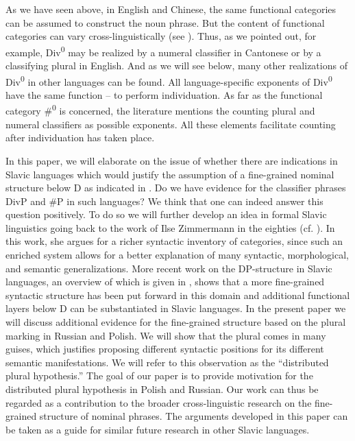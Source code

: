 \documentclass[output=paper,colorlinks,citecolor=brown,
]{langscibook}
\begin{document}
As we have seen above, in English and Chinese, the same functional categories can be assumed to construct the noun phrase. But the content of functional categories can vary cross-linguistically (see \citealt{RitterWiltschko2009}). Thus, as we pointed out, for example, Div\textsuperscript{0} may be realized by a numeral classifier in Cantonese or by a classifying plural in English. And as we will see below, many other realizations of Div\textsuperscript{0} in other languages can be found. All language-specific exponents of Div\textsuperscript{0} have the same function -- to perform individuation. As far as the functional category \#\textsuperscript{0} is concerned, the literature mentions the counting plural and numeral classifiers as possible exponents. All these elements facilitate counting after individuation has taken place. 

In this paper, we will elaborate on the issue of whether there are indications in Slavic languages which would justify the assumption of a fine-grained nominal structure below D as indicated in . Do we have evidence for the classifier phrases DivP and \#P in such languages? We think that one can indeed answer this question positively. To do so we will further develop an idea in formal Slavic linguistics going back to the work of Ilse Zimmermann in the eighties (cf. \citealt{Zimmermann1983,Zimmermann1988}). In this work, she argues for a richer syntactic inventory of categories, since such an enriched system allows for a better explanation of many syntactic, morphological, and semantic generalizations. More recent work on the DP-structure in Slavic languages, an overview of which is given in \citet{Geist2021}, shows that a more fine-grained syntactic structure has been put forward in this domain and additional functional layers below D can be substantiated in Slavic languages. In the present paper we will discuss additional evidence for the fine-grained structure based on the plural marking in Russian and Polish. We will show that the plural comes in many guises, which justifies proposing different syntactic positions for its different semantic manifestations. We will refer to this observation as the ``distributed plural hypothesis.'' The goal of our paper is to provide motivation for the distributed plural hypothesis in Polish and Russian. Our work can thus be regarded as a contribution to the broader cross-linguistic research on the fine-grained structure of nominal phrases. The arguments developed in this paper can be taken as a guide for similar future research in other Slavic languages.
\end{document}
